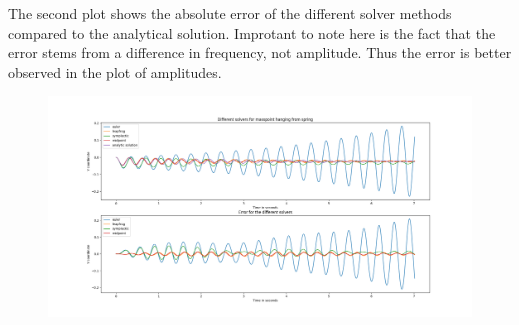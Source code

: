 \documentclass[11pt]{article}
\begin{document}
The second plot shows the absolute error of the different solver methods
compared to the analytical solution. Improtant to note here is the fact
that the error stems from a difference in frequency, not amplitude. Thus
the error is better observed in the plot of amplitudes.
\begin{figure}[h]
    \centering
    \includegraphics[width=\textwidth]{plots.png}
\end{figure}
    

    
    
    
    
\end{document}
